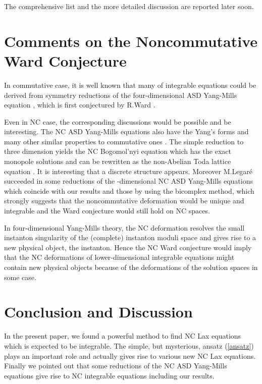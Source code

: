 \documentclass[a4paper,12pt]{article}\setlength{\topmargin}{-1cm}
\begin{document}
The comprehensive list and the more detailed discussion 
are reported later soon.

\section{Comments on the Noncommutative Ward Conjecture}

In commutative case, it is well known that 
many of integrable equations could be
derived from symmetry reductions of the four-dimensional
ASD Yang-Mills equation \cite{Conj},
which is first conjectured by R.Ward \cite{Ward}.

Even in NC case,
the corresponding discussions would be possible and be interesting.
The NC ASD Yang-Mills equations also have the Yang's 
forms \cite{Nekrasov2, Nekrasov} and many other similar
properties to commutative ones \cite{KKO}.
The simple reduction to three dimension
yields the NC Bogomol'nyi equation
which has the exact monopole solutions and can be rewritten 
as the non-Abelian Toda lattice equation \cite{Nekrasov, GrNe}.
It is interesting that a discrete structure appears.
Moreover M.Legar\'e \cite{Legare} succeeded in some reductions
of the \coordHE{}-dimensional NC ASD Yang-Mills equations which coincide
with our results and those by using the bicomplex method,
which strongly suggests that the noncommutative deformation
would be unique and integrable
and the Ward conjecture would still hold on NC spaces.

In four-dimensional Yang-Mills theory,
the NC deformation resolves the small instanton 
singularity of the (complete) instanton moduli space
and gives rise to a new physical object, the \coordHE{} instanton.
Hence the NC Ward conjecture would imply that
the NC deformations of lower-dimensional integrable equations
might contain new physical objects
because of the deformations of the solution spaces in some case.

\section{Conclusion and Discussion}

In the present paper, 
we found a powerful method to
find NC Lax equations which
is expected to be integrable.
The simple, but mysterious, ansatz (\ref{ansatz}) 
plays an important role
and actually gives rise to various new NC Lax equations.
Finally we pointed out that some reductions of the NC
ASD Yang-Mills equations give rise to
NC integrable equations including our results.
\end{document}
